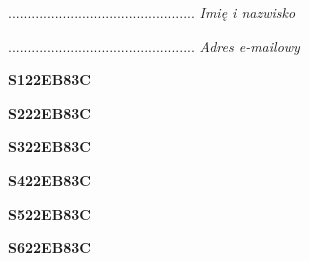 \begin{turn}{90}\begin{minipage}{\linewidth} \vspace{20mm} ................................................  \textit{Imię i nazwisko}\end{minipage}\end{turn}

\begin{turn}{90}\begin{minipage}{\linewidth} \vspace{20mm} ................................................  \textit{Adres e-mailowy}\end{minipage}\end{turn}

\begin{turn}{90}\huge \begin{minipage}{\linewidth} \vspace{10mm}\textbf{S122EB83C}\end{minipage}\end{turn}

\begin{turn}{90}\huge \begin{minipage}{\linewidth} \vspace{10mm}\textbf{S222EB83C}\end{minipage}\end{turn}

\begin{turn}{90}\huge \begin{minipage}{\linewidth} \vspace{10mm}\textbf{S322EB83C}\end{minipage}\end{turn}

\begin{turn}{90}\huge \begin{minipage}{\linewidth} \vspace{10mm}\textbf{S422EB83C}\end{minipage}\end{turn}

\begin{turn}{90}\huge \begin{minipage}{\linewidth} \vspace{10mm}\textbf{S522EB83C}\end{minipage}\end{turn}

\begin{turn}{90}\huge \begin{minipage}{\linewidth} \vspace{10mm}\textbf{S622EB83C}\end{minipage}\end{turn}

